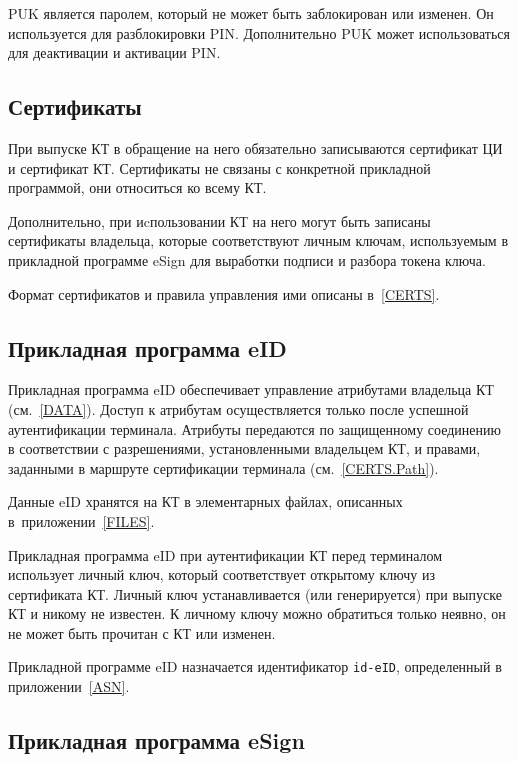 PUK является паролем, который не может быть заблокирован или изменен. 
Он используется для разблокировки 
PIN. Дополнительно PUK может использоваться для деактивации и активации PIN. 

\subsection{Сертификаты}\label{OBJ.Certs}

При выпуске КТ в обращение на него обязательно записываются сертификат 
ЦИ и сертификат КТ. 
Сертификаты не связаны с конкретной 
прикладной программой, они относиться ко всему КТ. 

Дополнительно, при иcпользовании КТ на него могут быть записаны
сертификаты владельца, которые соответствуют личным ключам, используемым
в прикладной программе eSign для выработки подписи и разбора токена ключа.


Формат сертификатов и правила управления ими описаны в~\ref{CERTS}.

\subsection{Прикладная программа eID}\label{OBJ.eID}

Прикладная программа eID обеспечивает управление атрибутами владельца КТ 
(см.~\ref{DATA}). Доступ к атрибутам 
осуществляется только после успешной аутентификации терминала. Атрибуты 
передаются по защищенному соединению в соответствии с разрешениями, 
установленными владельцем КТ, и правами, заданными в маршруте сертификации 
терминала (см.~\ref{CERTS.Path}).  

Данные eID хранятся на КТ в элементарных файлах, описанных в~приложении~\ref{FILES}.

Прикладная программа eID при аутентификации КТ перед терминалом использует личный 
ключ, который соответствует открытому ключу из сертификата КТ. 
Личный ключ устанавливается (или генерируется) при выпуске КТ и никому не 
известен. К личному ключу можно обратиться только неявно, он не может быть 
прочитан с КТ или изменен. 

Прикладной программе eID назначается идентификатор \verb|id-eID|, 
определенный в приложении~\ref{ASN}. 

\subsection{Прикладная программа eSign}\label{OBJ.eSign}

